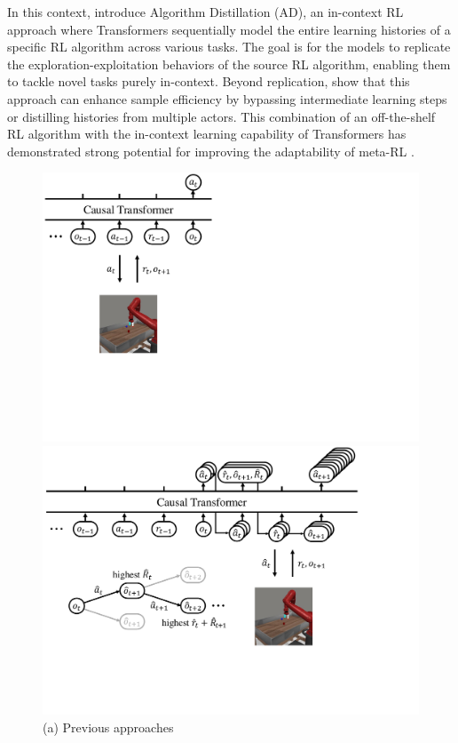 \documentclass{article}
\begin{document}
In this context, \citet{AD} introduce Algorithm Distillation (AD), an in-context RL approach where Transformers sequentially model the entire learning histories of a specific RL algorithm across various tasks.
The goal is for the models to replicate the exploration-exploitation behaviors of the source RL algorithm, enabling them to tackle novel tasks purely in-context.
Beyond replication, \citet{AD} show that this approach can enhance sample efficiency by bypassing intermediate learning steps or distilling histories from multiple actors.
This combination of an off-the-shelf RL algorithm with the in-context learning capability of Transformers has demonstrated strong potential for improving the adaptability of meta-RL \citep{DPT,AT,IDT,AD-eps,Headless-AD}.


\begin{figure}[t]
    \centering
    \begin{minipage}[b]{0.31\textwidth}
        \centering
        \includegraphics[width=\textwidth, trim={0pt 186pt 438pt 0pt}, clip]{figures/main-1.pdf}
        \vspace{-7pt}
        \caption*{(a) Previous approaches}
    \end{minipage}
    \hfill
    \begin{minipage}[b]{0.60\textwidth}
        \centering
        \includegraphics[width=\textwidth, trim={0pt 144pt 126pt 0pt}, clip]{figures/main-2.pdf}

\end{minipage}
\end{figure}
\end{document}
